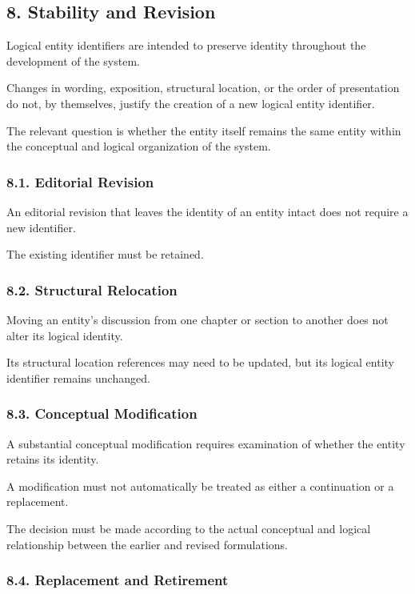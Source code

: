 \subsection*{8. Stability and Revision}

Logical entity identifiers are
intended to preserve identity
throughout the development of
the system.

Changes in wording, exposition,
structural location, or the order
of presentation do not, by themselves,
justify the creation of a new
logical entity identifier.

The relevant question is whether
the entity itself remains the
same entity within the conceptual
and logical organization of
the system.

\subsubsection*{8.1. Editorial Revision}

An editorial revision that leaves
the identity of an entity intact
does not require a new identifier.

The existing identifier must
be retained.

\subsubsection*{8.2. Structural Relocation}

Moving an entity's discussion
from one chapter or section to
another does not alter its
logical identity.

Its structural location references
may need to be updated, but
its logical entity identifier
remains unchanged.

\subsubsection*{8.3. Conceptual Modification}

A substantial conceptual modification
requires examination of whether
the entity retains its identity.

A modification must not automatically
be treated as either a continuation
or a replacement.

The decision must be made according
to the actual conceptual and logical
relationship between the earlier
and revised formulations.

\subsubsection*{8.4. Replacement and Retirement}

